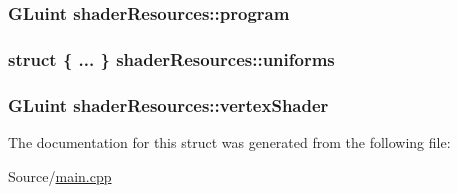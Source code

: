 \label{structshader_resources_a074cd8e5271a817d584c38e21a474ce2}
\hypertarget{structshader_resources_aeb0b002a54cffa47fa0ab63402d9e877}{
\subsubsection[{program}]{\setlength{\rightskip}{0pt plus 5cm}\-G\-Luint {\bf shader\-Resources\-::program}}}
\label{structshader_resources_aeb0b002a54cffa47fa0ab63402d9e877}
\hypertarget{structshader_resources_afa2fe5d923b03ebc556d7e139ce3d559}{
\subsubsection[{uniforms}]{\setlength{\rightskip}{0pt plus 5cm}struct \{ ... \}  {\bf shader\-Resources\-::uniforms}}}
\label{structshader_resources_afa2fe5d923b03ebc556d7e139ce3d559}
\hypertarget{structshader_resources_abe191bcd7c0511350d50df60d4105650}{
\subsubsection[{vertex\-Shader}]{\setlength{\rightskip}{0pt plus 5cm}\-G\-Luint {\bf shader\-Resources\-::vertex\-Shader}}}
\label{structshader_resources_abe191bcd7c0511350d50df60d4105650}


\-The documentation for this struct was generated from the following file\-:\begin{DoxyCompactItemize}
\item 
\-Source/\hyperlink{main_8cpp}{main.\-cpp}\end{DoxyCompactItemize}
